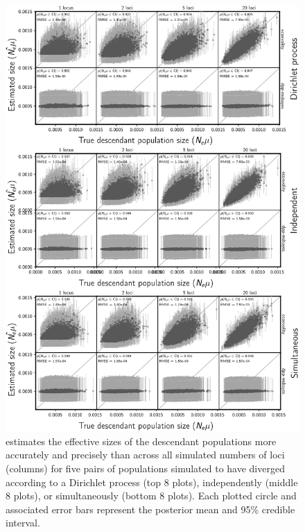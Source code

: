 \clearpage

\begin{figure}[htbp]
    \begin{center}
        \includegraphics[width=\textwidth,height=0.9\textheight,keepaspectratio]{../images/from-project-repo/plots/tex-plot-grids/grid-leaf-pop-size-scatter-cropped.pdf}
        \caption{
            \scriptsize
            \Ecoevolity estimates the effective sizes of the
            descendant populations more accurately and precisely than
            \dppmsbayes across all simulated numbers of loci
            (columns) for five pairs of populations simulated to have diverged
            according to a Dirichlet process (top 8 plots),
            independently (middle 8 plots),
            or simultaneously (bottom 8 plots).
            Each plotted circle and associated error bars represent the posterior mean
            and 95\% credible interval.
            \accuracyscatterplotannotations{\epopsize{}}
        }
        \label{fig:leafpopsizescatterdp}
    \end{center}
\end{figure}

